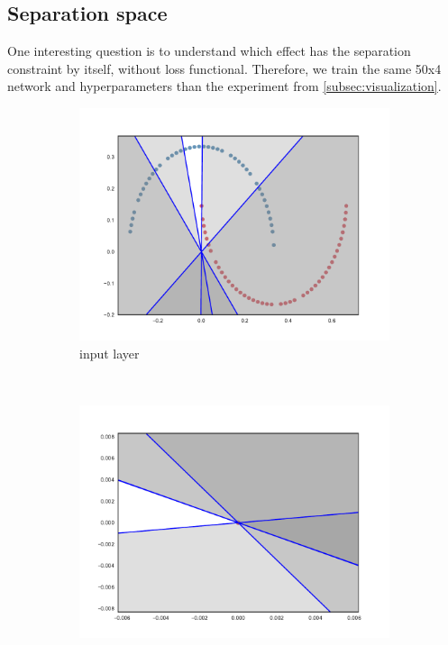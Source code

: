 \subsection{Separation space}

One interesting question is to understand which effect has the separation constraint by itself, without loss functional. Therefore, we train the same 50x4 network and hyperparameters than the experiment from \ref{subsec:visualization}.

\begin{figure}
  \centering
    \begin{subfigure}[b]{0.3\textwidth}
        \includegraphics[width=\textwidth]{img/init/relu/conv2d_1-0.pdf}
        \caption{\ReLU input layer}
        \label{fig:reluInitInput}
    \end{subfigure}
    ~ %
    \begin{subfigure}[b]{0.3\textwidth}
        \includegraphics[width=\textwidth]{img/init/relu/conv2d_50-0.pdf}

\end{subfigure}
\end{figure}
